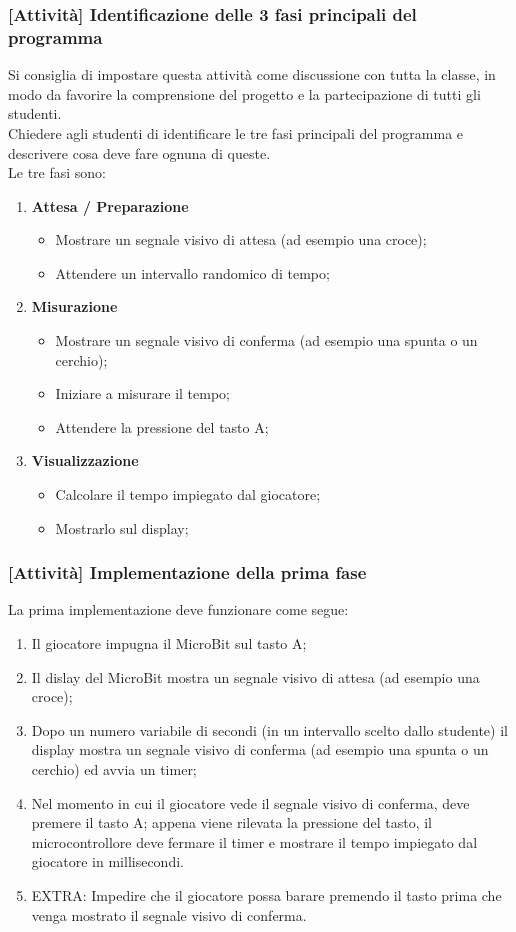 \documentclass[../../docenti.tex]{subfiles}
\begin{document}
\subsubsection{[Attività] Identificazione delle 3 fasi principali del programma}
Si consiglia di impostare questa attività come discussione con tutta la classe, in modo da favorire la comprensione del progetto e la partecipazione di tutti gli studenti.\\
Chiedere agli studenti di identificare le tre fasi principali del programma e descrivere cosa deve fare ognuna di queste.\\
Le tre fasi sono:
\begin{enumerate}
	\item \textbf{Attesa / Preparazione}
	\begin{itemize}
		\item Mostrare un segnale visivo di attesa (ad esempio una croce);
		\item Attendere un intervallo randomico di tempo;
	\end{itemize}
	\item \textbf{Misurazione}
	\begin{itemize}
		\item Mostrare un segnale visivo di conferma (ad esempio una spunta o un cerchio);
		\item Iniziare a misurare il tempo;
		\item Attendere la pressione del tasto A;
	\end{itemize}
	\item \textbf{Visualizzazione}
	\begin{itemize}
		\item Calcolare il tempo impiegato dal giocatore;
		\item Mostrarlo sul display;
	\end{itemize}
\end{enumerate}

\subsubsection{[Attività] Implementazione della prima fase}

La prima implementazione deve funzionare come segue:
\begin{enumerate}
	\item Il giocatore impugna il MicroBit sul tasto A;
	\item Il dislay del MicroBit mostra un segnale visivo di attesa (ad esempio una croce);
	\item Dopo un numero variabile di secondi (in un intervallo scelto dallo studente) il display mostra un segnale visivo di conferma (ad esempio una spunta o un cerchio) ed avvia un timer;
	\item Nel momento in cui il giocatore vede il segnale visivo di conferma, deve premere il tasto A; appena viene rilevata la pressione del tasto, il microcontrollore deve fermare il timer e mostrare il tempo impiegato dal giocatore in millisecondi.
	\item EXTRA: Impedire che il giocatore possa barare premendo il tasto prima che venga mostrato il segnale visivo di conferma.
\end{enumerate}
\end{document}

